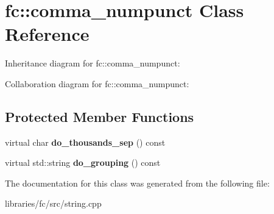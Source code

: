 \hypertarget{classfc_1_1comma__numpunct}{}\section{fc\+:\+:comma\+\_\+numpunct Class Reference}
\label{classfc_1_1comma__numpunct}


Inheritance diagram for fc\+:\+:comma\+\_\+numpunct\+:


Collaboration diagram for fc\+:\+:comma\+\_\+numpunct\+:
\subsection*{Protected Member Functions}
\begin{DoxyCompactItemize}
\item 
\mbox{\label{classfc_1_1comma__numpunct_a73d5e47f2c007efee5098e03e70e5c56}} 
virtual char {\bfseries do\+\_\+thousands\+\_\+sep} () const
\item 
\mbox{\label{classfc_1_1comma__numpunct_aec3c3fa44dd5665af147c3e9f7a1a971}} 
virtual std\+::string {\bfseries do\+\_\+grouping} () const
\end{DoxyCompactItemize}


The documentation for this class was generated from the following file\+:\begin{DoxyCompactItemize}
\item 
libraries/fc/src/string.\+cpp\end{DoxyCompactItemize}
